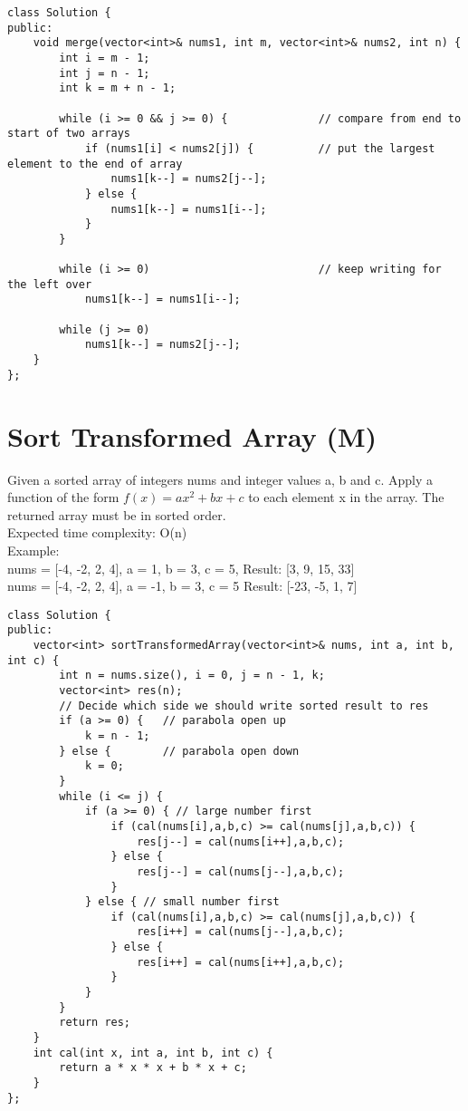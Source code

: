 \begin{lstlisting}
class Solution {
public:
    void merge(vector<int>& nums1, int m, vector<int>& nums2, int n) {
        int i = m - 1;
        int j = n - 1;
        int k = m + n - 1;
        
        while (i >= 0 && j >= 0) {              // compare from end to start of two arrays
            if (nums1[i] < nums2[j]) {          // put the largest element to the end of array
                nums1[k--] = nums2[j--];
            } else {
                nums1[k--] = nums1[i--];
            }
        }
        
        while (i >= 0)                          // keep writing for the left over
            nums1[k--] = nums1[i--];
            
        while (j >= 0)
            nums1[k--] = nums2[j--];
    }
};
\end{lstlisting}


\section{Sort Transformed Array (M)}
Given a sorted array of integers nums and integer values a, b and c. Apply a function of the form $f(x) = ax^2 + bx + c$ to each element x in the array. The returned array must be in sorted order.\\

Expected time complexity: O(n)\\

Example:\\
nums = [-4, -2, 2, 4], a = 1, b = 3, c = 5,
Result: [3, 9, 15, 33]\\
nums = [-4, -2, 2, 4], a = -1, b = 3, c = 5
Result: [-23, -5, 1, 7]\\

\begin{lstlisting}
class Solution {
public:
    vector<int> sortTransformedArray(vector<int>& nums, int a, int b, int c) {
        int n = nums.size(), i = 0, j = n - 1, k;
        vector<int> res(n);
        // Decide which side we should write sorted result to res
        if (a >= 0) {   // parabola open up
            k = n - 1;
        } else {        // parabola open down
            k = 0;
        }
        while (i <= j) {
            if (a >= 0) { // large number first
                if (cal(nums[i],a,b,c) >= cal(nums[j],a,b,c)) {
                    res[j--] = cal(nums[i++],a,b,c);
                } else {
                    res[j--] = cal(nums[j--],a,b,c);
                }
            } else { // small number first
                if (cal(nums[i],a,b,c) >= cal(nums[j],a,b,c)) {
                    res[i++] = cal(nums[j--],a,b,c);
                } else {
                    res[i++] = cal(nums[i++],a,b,c);
                }
            }
        }
        return res;
    }
    int cal(int x, int a, int b, int c) {
        return a * x * x + b * x + c;
    }
};
\end{lstlisting}


